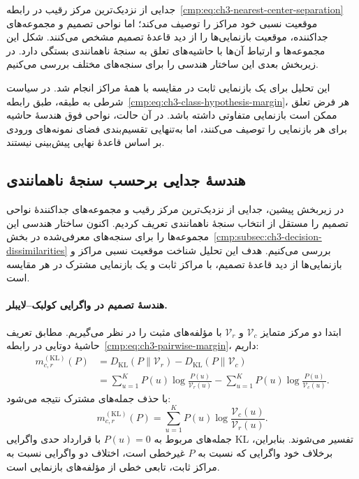 جدایی از نزدیک‌ترین مرکز رقیب در
رابطه~\eqref{cmp:eq:ch3-nearest-center-separation}
موقعیت نسبی خود مراکز را توصیف می‌کند؛
اما نواحی تصمیم و مجموعه‌های جداکننده، موقعیت
بازنمایی‌ها را از دید قاعدهٔ تصمیم مشخص می‌کنند.
شکل این مجموعه‌ها و ارتباط آن‌ها با حاشیه‌های
تعلق به سنجهٔ ناهمانندی بستگی دارد. در زیربخش
بعدی این ساختار هندسی را برای سنجه‌های مختلف
بررسی می‌کنیم.

این تحلیل برای یک بازنمایی ثابت در مقایسه
با همهٔ مراکز انجام شد. در سیاست شرطی به
طبقه، طبق
رابطه~\eqref{cmp:eq:ch3-class-hypothesis-margin}،
هر فرض تعلق ممکن است بازنمایی متفاوتی داشته
باشد. در آن حالت، نواحی فوق هندسهٔ حاشیه
برای هر بازنمایی را توصیف می‌کنند، اما
به‌تنهایی تقسیم‌بندی فضای نمونه‌های ورودی
بر اساس قاعدهٔ نهایی پیش‌بینی نیستند.

\subsection{هندسهٔ جدایی برحسب سنجهٔ ناهمانندی}
\label{cmp:subsec:ch3-dissimilarity-decision-geometry}

در زیربخش پیشین، جدایی از نزدیک‌ترین مرکز رقیب
و مجموعه‌های جداکنندهٔ نواحی تصمیم را مستقل از
انتخاب سنجهٔ ناهمانندی تعریف کردیم. اکنون ساختار
هندسی این مجموعه‌ها را برای سنجه‌های معرفی‌شده
در بخش~\ref{cmp:subsec:ch3-decision-dissimilarities}
بررسی می‌کنیم. هدف این تحلیل شناخت موقعیت نسبی
مراکز و بازنمایی‌ها از دید قاعدهٔ تصمیم، با
مراکز ثابت و یک بازنمایی مشترک در هر مقایسه است.

\paragraph{هندسهٔ تصمیم در واگرایی کولبک--لایبلر.}
ابتدا دو مرکز متمایز $\mathcal V_c$ و $\mathcal V_r$
با مؤلفه‌های مثبت را در نظر می‌گیریم.
مطابق تعریف حاشیهٔ دوتایی در
رابطه~\eqref{cmp:eq:ch3-pairwise-margin}، داریم:
\begin{align*}
m_{c,r}^{(\mathrm{KL})}(P)
&=D_{\mathrm{KL}}(P\|\mathcal V_r)
-D_{\mathrm{KL}}(P\|\mathcal V_c)\\
&=\sum_{u=1}^{K}P(u)\log\frac{P(u)}{\mathcal V_r(u)}
-\sum_{u=1}^{K}P(u)\log\frac{P(u)}{\mathcal V_c(u)}.
\end{align*}
با حذف جمله‌های مشترک نتیجه می‌شود:
\begin{equation}\label{cmp:eq:ch3-kl-linear-margin}
\boxed{
m_{c,r}^{(\mathrm{KL})}(P)
=\sum_{u=1}^{K}P(u)
\log\frac{\mathcal V_c(u)}{\mathcal V_r(u)}.
}
\end{equation}
جمله‌های مربوط به $P(u)=0$ با قرارداد حدی
واگرایی KL تفسیر می‌شوند. بنابراین، برخلاف خود
واگرایی که نسبت به $P$ غیرخطی است، اختلاف دو
واگرایی نسبت به مراکز ثابت، تابعی خطی از
مؤلفه‌های بازنمایی است.

